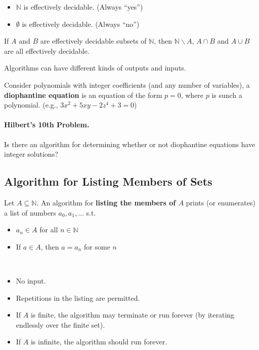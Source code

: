 \begin{itemize}
    \item $\mathbb{N}$ is effectively decidable. (Always ``yes'')
    \item $\emptyset$ is effectively decidable. (Always ``no'')
\end{itemize}

\begin{theorem}
    If $A$ and $B$ are effectively decidable subsets of $\mathbb{N}$, then $\mathbb{N}\backslash A$, $A \cap B$ and $A \cup B$ are all effectively decidable.
\end{theorem}

Algorithms can have different kinds of outputs and inputs.

\begin{definition}
    Consider polynomials with integer coefficients (and any number of variables), a \textbf{diophantine equation} is an equation of the form $p=0$, where $p$ is sunch a polynomial. (e.g., $3x^2 + 5xy - 2z^4 +3 = 0$)
\end{definition}

\paragraph{Hilbert's 10th Problem.} Is there an algorithm for determining whether or not diophantine equations have integer solutions?

\subsection{Algorithm for Listing Members of Sets}
\label{sub:AlgoForListingMembersOfSets}

\begin{definition}
    \label{def:AlgoForListingMembersOfSets}
    Let $A \subseteq \mathbb{N}$. An algorithm for \textbf{listing the members of $A$} prints (or enumerates) a list of numbers $a_0,a_1,\dots$ s.t.
    \begin{itemize}
        \item $a_n \in A$ for all $n \in \mathbb{N}$
        \item If $a \in A$, then $a = a_n$ for some $n$
    \end{itemize}
\end{definition}
\begin{remark} ~{}
    \begin{itemize}
        \item No input.
        \item Repetitions in the listing are permitted.
        \item If $A$ is finite, the algorithm may terminate or run forever (by iterating endlessly over the finite set).
        \item If $A$ is infinite, the algorithm should run forever.
    \end{itemize}
\end{remark}


